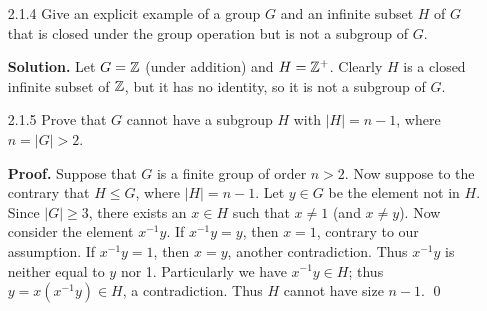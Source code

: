 \begin{enumerate}
       \qed
   \item[2.1.4]   Give an explicit example of a group $G$ and an infinite subset
                  $H$ of $G$ that is closed under the group operation but is not
                  a subgroup of $G$.

      \textbf{Solution.} Let $G = \mathbb{Z}$ (under addition) and $H = \mathbb{Z}^+$. Clearly
      $H$ is a closed infinite subset of $\mathbb{Z}$, but it has no identity, so it is 
      not a subgroup of $G$.
   \item[2.1.5]   Prove that $G$ cannot have a subgroup $H$ with $|H| = n - 1$,
                  where $n = |G| > 2$.

      \textbf{Proof.} Suppose that $G$ is a finite group of order $n > 2$. Now
      suppose to the contrary that $H \le G$, where $|H| = n - 1$. Let $y \in G$
      be the element not in $H$. Since $|G| \ge 3$, there exists an
      $x \in H$ such that $x \neq 1$ (and $x \neq y$). Now consider the element
      $x^{-1}y$. If $x^{-1}y = y$, then $x = 1$, contrary to our assumption. If
      $x^{-1}y = 1$, then $x = y$, another contradiction. Thus $x^{-1}y$ is
      neither equal to $y$ nor 1. Particularly we have $x^{-1}y \in H$; thus
      $y = x(x^{-1}y) \in H$, a contradiction. Thus $H$ cannot have size
      $n - 1$. \qed


\end{enumerate}
